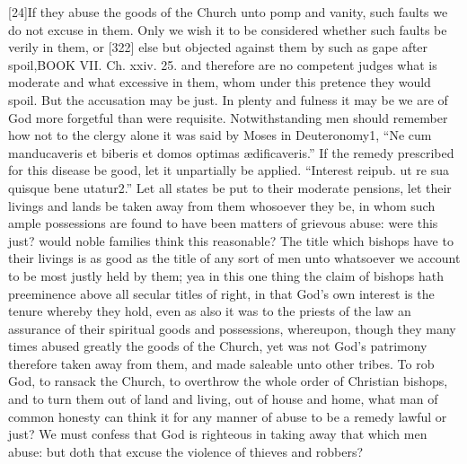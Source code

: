 [24]If they abuse the goods of the Church unto pomp and vanity, such faults we do not excuse in them. Only we wish it to be considered whether such faults be verily in them, or [322] else but objected against them by such as gape after spoil,BOOK VII. Ch. xxiv. 25. and therefore are no competent judges what is moderate and what excessive in them, whom under this pretence they would spoil. But the accusation may be just. In plenty and fulness it may be we are of God more forgetful than were requisite. Notwithstanding men should remember how not to the clergy alone it was said by Moses in Deuteronomy1, “Ne cum manducaveris et biberis et domos optimas ædificaveris.” If the remedy prescribed for this disease be good, let it unpartially be applied. “Interest reipub. ut re sua quisque bene utatur2.” Let all states be put to their moderate pensions, let their livings and lands be taken away from them whosoever they be, in whom such ample possessions are found to have been matters of grievous abuse: were this just? would noble families think this reasonable? The title which bishops have to their livings is as good as the title of any sort of men unto whatsoever we account to be most justly held by them; yea in this one thing the claim of bishops hath preeminence above all secular titles of right, in that God’s own interest is the tenure whereby they hold, even as also it was to the priests of the law an assurance of their spiritual goods and possessions, whereupon, though they many times abused greatly the goods of the Church, yet was not God’s patrimony therefore taken away from them, and made saleable unto other tribes. To rob God, to ransack the Church, to overthrow the whole order of Christian bishops, and to turn them out of land and living, out of house and home, what man of common honesty can think it for any manner of abuse to be a remedy lawful or just? We must confess that God is righteous in taking away that which men abuse: but doth that excuse the violence of thieves and robbers?

